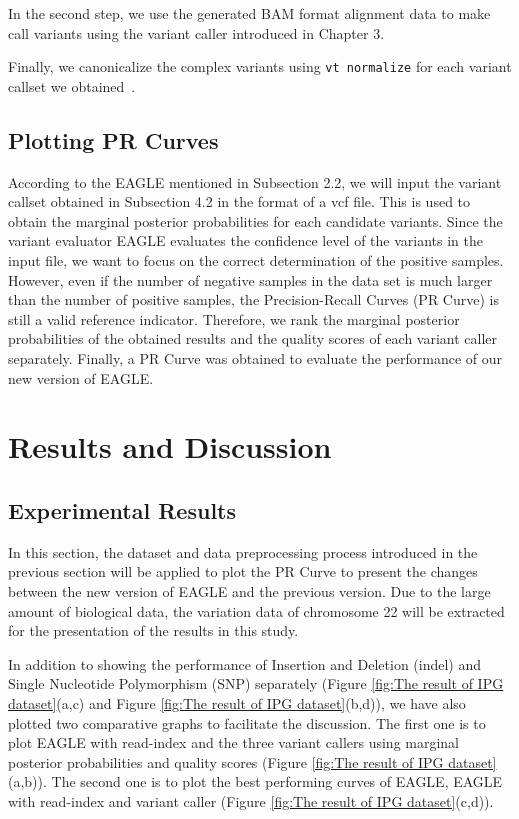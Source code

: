 \documentclass[PhD]{PHlab-thesis}
\begin{document}
In the second step, we use the generated BAM format alignment data to make call variants using the variant caller introduced in Chapter 3.

Finally, we canonicalize the complex variants using \texttt{vt normalize} for each variant callset we obtained~\cite{Tan2015Vt}.

\section{Plotting PR Curves}
According to the EAGLE mentioned in Subsection 2.2, we will input the variant callset obtained in Subsection 4.2 in the format of a vcf file. This is used to obtain the marginal posterior probabilities for each candidate variants.
Since the variant evaluator EAGLE evaluates the confidence level of the variants in the input file, we want to focus on the correct determination of the positive samples.
However, even if the number of negative samples in the data set is much larger than the number of positive samples, the Precision-Recall Curves (PR Curve) is still a valid reference indicator.
Therefore, we rank the marginal posterior probabilities of the obtained results and the quality scores of each variant caller separately. Finally, a PR Curve was obtained to evaluate the performance of our new version of EAGLE.

\chapter{Results and Discussion}
\section{Experimental Results}
In this section, the dataset and data preprocessing process introduced in the previous section will be applied to plot the PR Curve to present the changes between the new version of EAGLE and the previous version. Due to the large amount of biological data, the variation data of chromosome 22 will be extracted for the presentation of the results in this study.

In addition to showing the performance of Insertion and Deletion (indel) and Single Nucleotide Polymorphism (SNP) separately (Figure \ref{fig:The result of IPG dataset}(a,c) and Figure \ref{fig:The result of IPG dataset}(b,d)), we have also plotted two comparative graphs to facilitate the discussion.
The first one is to plot EAGLE with read-index and the three variant callers using marginal posterior probabilities and quality scores (Figure \ref{fig:The result of IPG dataset}(a,b)).
The second one is to plot the best performing curves of EAGLE, EAGLE with read-index and variant caller (Figure \ref{fig:The result of IPG dataset}(c,d)).
\end{document}
